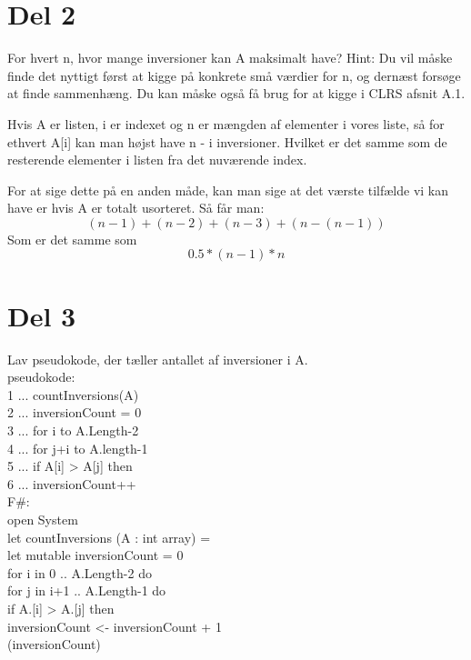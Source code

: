 \documentclass[12pt, a4paper, hidelinks]{article}
\begin{document}
\section{Del 2}
For hvert n, hvor mange inversioner kan A maksimalt have?
Hint: Du vil måske finde det nyttigt først at kigge på konkrete små værdier for n,
og dernæst forsøge at finde sammenhæng. Du kan måske også få brug for at kigge i
CLRS afsnit A.1.

Hvis A er listen, i er indexet og n er mængden af elementer i vores liste, så for ethvert A[i] kan man højst have n - i inversioner. Hvilket er det samme som de resterende elementer
i listen fra det nuværende index.

For at sige dette på en anden måde, kan man sige at det værste tilfælde vi kan have er hvis A er totalt usorteret. 
Så får man: $$ (n-1) + (n-2) + (n-3) + (n-(n-1)) $$
Som er det samme som $$ 0.5 * (n-1) * n $$

\section{Del 3}
Lav pseudokode, der tæller antallet af inversioner i A. \\

pseudokode: \\
1 ... countInversions(A) \\
2 ... \indent inversionCount = 0 \\
3 ... \indent for i to A.Length-2 \\
4 ... \indent \indent for j+i to A.length-1 \\
5 ... \indent \indent \indent if A[i] > A[j] then \\
6 ... \indent \indent \indent \indent inversionCount++ \\

F#: \\
open System \\

let countInversions (A : int array) =  \\
    let mutable inversionCount = 0 \\
    for i in 0 .. A.Length-2 do \\
        for j in i+1 .. A.Length-1 do \\
            if A.[i] > A.[j] then \\
                inversionCount <- inversionCount + 1 \\
    (inversionCount) \\
\end{document}
